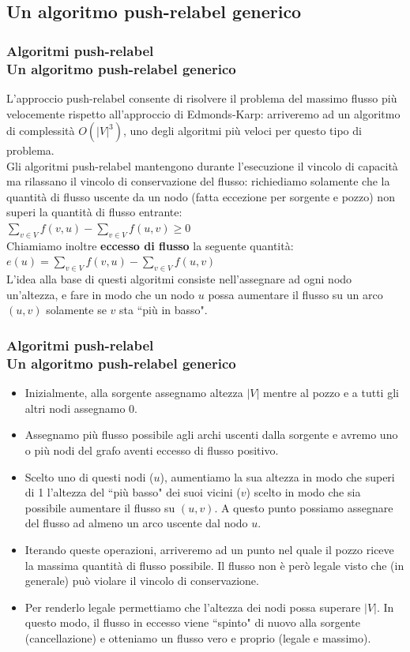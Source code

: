 \documentclass{beamer}
\begin{document}
\subsection{Un algoritmo push-relabel generico}

\begin{frame}
\frametitle{Algoritmi push-relabel\\Un algoritmo push-relabel generico}
L'approccio push-relabel consente di risolvere il problema del massimo flusso più velocemente rispetto all'approccio di Edmonds-Karp: arriveremo ad un algoritmo di complessità $O(|V|^3)$, uno degli algoritmi più veloci per questo tipo di problema.\\
Gli algoritmi push-relabel mantengono durante l'esecuzione il vincolo di capacità ma rilassano il vincolo di conservazione del flusso: richiediamo solamente che la quantità di flusso uscente da un nodo (fatta eccezione per sorgente e pozzo) non superi la quantità di flusso entrante:\\
$\sum\limits_{v\in V}f(v,u)-\sum\limits_{v\in V}f(u,v)\geq 0$\\
Chiamiamo inoltre \textbf{eccesso di flusso} la seguente quantità:\\
$e(u)=\sum\limits_{v\in V}f(v,u)-\sum\limits_{v\in V}f(u,v)$\\
L'idea alla base di questi algoritmi consiste nell'assegnare ad ogni nodo un'altezza, e fare in modo che un nodo $u$ possa aumentare il flusso su un arco $(u,v)$ solamente se $v$ sta ``più in basso".
\end{frame}

\begin{frame}
\frametitle{Algoritmi push-relabel\\Un algoritmo push-relabel generico}
\begin{itemize}
\item Inizialmente, alla sorgente assegnamo altezza $|V|$ mentre al pozzo e a tutti gli altri nodi assegnamo 0.
\item Assegnamo più flusso possibile agli archi uscenti dalla sorgente e avremo uno o più nodi del grafo aventi eccesso di flusso positivo.
\item Scelto uno di questi nodi ($u$), aumentiamo la sua altezza in modo che superi di 1 l'altezza del ``più basso" dei suoi vicini ($v$) scelto in modo che sia possibile aumentare il flusso su $(u,v)$. A questo punto possiamo assegnare del flusso ad almeno un arco uscente dal nodo $u$.
\item Iterando queste operazioni, arriveremo ad un punto nel quale il pozzo riceve la massima quantità di flusso possibile. Il flusso non è però legale visto che (in generale) può violare il vincolo di conservazione.
\item Per renderlo legale permettiamo che l'altezza dei nodi possa superare $|V|$. In questo modo, il flusso in eccesso viene ``spinto" di nuovo alla sorgente (cancellazione) e otteniamo un flusso vero e proprio (legale e massimo).
\end{itemize}
\end{frame}
\end{document}
